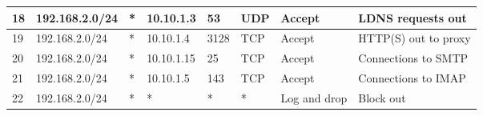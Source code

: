 \documentclass[a4paper, 11pt, oneside]{article}
\begin{document}
\begin{table}[H]
{\begin{tabular}{|llllllll|}
\multicolumn{1}{|l|}{18}                        & \multicolumn{1}{l|}{192.168.2.0/24}                                               & \multicolumn{1}{l|}{*}                                                              & \multicolumn{1}{l|}{10.10.1.3}                                                         & \multicolumn{1}{l|}{53}                                                                  & \multicolumn{1}{l|}{UDP}               & \multicolumn{1}{l|}{Accept}          & LDNS requests out                      \\ \hline
\multicolumn{1}{|l|}{19}                        & \multicolumn{1}{l|}{192.168.2.0/24}                                               & \multicolumn{1}{l|}{*}                                                              & \multicolumn{1}{l|}{10.10.1.4}                                                         & \multicolumn{1}{l|}{3128}                                                                & \multicolumn{1}{l|}{TCP}               & \multicolumn{1}{l|}{Accept}          & HTTP(S) out to proxy                   \\ \hline
\multicolumn{1}{|l|}{20}                        & \multicolumn{1}{l|}{192.168.2.0/24}                                               & \multicolumn{1}{l|}{*}                                                              & \multicolumn{1}{l|}{10.10.1.15}                                                        & \multicolumn{1}{l|}{25}                                                                  & \multicolumn{1}{l|}{TCP}               & \multicolumn{1}{l|}{Accept}          & Connections to SMTP                    \\ \hline
\multicolumn{1}{|l|}{21}                        & \multicolumn{1}{l|}{192.168.2.0/24}                                               & \multicolumn{1}{l|}{*}                                                              & \multicolumn{1}{l|}{10.10.1.5}                                                         & \multicolumn{1}{l|}{143}                                                                 & \multicolumn{1}{l|}{TCP}               & \multicolumn{1}{l|}{Accept}          & Connections to IMAP                    \\ \hline
\multicolumn{1}{|l|}{22}                        & \multicolumn{1}{l|}{192.168.2.0/24}                                               & \multicolumn{1}{l|}{*}                                                              & \multicolumn{1}{l|}{*}                                                                 & \multicolumn{1}{l|}{*}                                                                   & \multicolumn{1}{l|}{*}                 & \multicolumn{1}{l|}{Log and drop}    & Block out                              \\ \hline

\end{tabular}}
\end{table}
\end{document}
